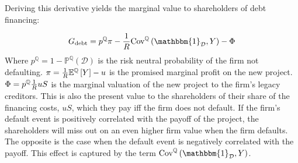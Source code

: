 \documentclass[../main.tex]{subfiles}
\begin{document}

        Deriving this derivative yields the marginal value to shareholders of debt financing:

            \begin{equation}
                G_{\text{debt}} = 
                    p^{\mathbb{Q}} \pi 
                    - \discountfactor 
                    \text{Cov}^{\mathbb{Q}}\left(
                        \mathbbm{1}_{\mathcal{D}}, 
                        Y
                    \right) 
                    - \Phi
                    \label{eqn:marginal-shareholder-value-debt-financing}
            \end{equation}
        Where $p^{\mathbb{Q}} = 1 - \mathbb{P}^{\mathbb{Q}}\left(\mathcal{D}\right)$ is the risk neutral probability of the firm not defaulting. 
        $\pi = \frac{1}{R} \mathbb{E}^{\mathbb{Q}}\left[Y\right] - u$ 
        is the promised marginal profit on the new project. 
        $\Phi = p^{\mathbb{Q}} \frac{1}{R} u S$
        is the marginal valuation of the new project to the firm's legacy creditors. 
        This is also the present value to the shareholders of their share of the financing costs, $uS$,
        which they pay iff the firm does not default. 
        If the firm's default event is positively correlated with the payoff of the project,
        the shareholders will miss out on an even higher firm value when the firm defaults.
        The opposite is the case when the default event is negatively correlated with the payoff.
        This effect is captured by the term 
        $\text{Cov}^{\mathbb{Q}}\left(\mathbbm{1}_{\mathcal{D}}, Y\right)$.
\end{document}
